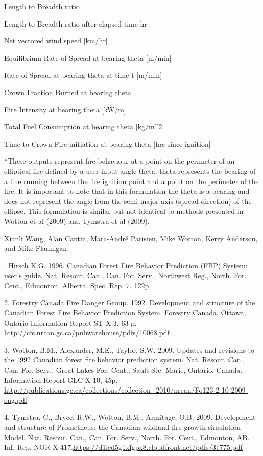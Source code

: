 \documentclass[a4paper]{book}
\begin{document}
\begin{Value}
\begin{ldescription}
\item[\code{LB}] Length to Breadth ratio
\item[\code{LBt}] Length to Breadth ratio after elapsed time hr 
\item[\code{WSV}] Net vectored wind speed [km/hr]
\item[\code{TROS*}] Equilibrium Rate of Spread at bearing theta [m/min] 
\item[\code{TROSt*}] Rate of Spread at bearing theta at time t [m/min] 
\item[\code{TCFB*}] Crown Fraction Burned at bearing theta 
\item[\code{TFI*}] Fire Intensity at bearing theta [kW/m] 
\item[\code{TTFC*}] Total Fuel Consumption at bearing theta [kg/m\textasciicircum{}2] 
\item[\code{TTI*}] Time to Crown Fire initiation at bearing theta [hrs since ignition] 

\end{ldescription}
*These outputs represent fire behaviour at a point on the perimeter of an
elliptical fire defined by a user input angle theta. theta represents the
bearing of a line running between the fire ignition point and a point on the
perimeter of the fire. It is important to note that in this formulation the
theta is a bearing and does not represent the angle from the semi-major axis
(spread direction) of the ellipse. This formulation is similar but not
identical to methods presented in Wotton et al (2009) and Tymstra et al
(2009).
\end{Value}
%
\begin{Author}\relax
Xianli Wang, Alan Cantin, Marc-André Parisien, Mike Wotton, Kerry
Anderson, and Mike Flannigan
\end{Author}
%
\begin{References}.  Hirsch K.G. 1996. Canadian Forest Fire Behavior Prediction
(FBP) System: user's guide. Nat. Resour. Can., Can. For. Serv., Northwest
Reg., North. For. Cent., Edmonton, Alberta. Spec. Rep. 7. 122p.

2.  Forestry Canada Fire Danger Group. 1992. Development and structure of
the Canadian Forest Fire Behavior Prediction System. Forestry Canada,
Ottawa, Ontario Information Report ST-X-3. 63 p.
\url{http://cfs.nrcan.gc.ca/pubwarehouse/pdfs/10068.pdf}

3.  Wotton, B.M., Alexander, M.E., Taylor, S.W. 2009. Updates and revisions
to the 1992 Canadian forest fire behavior prediction system. Nat. Resour.
Can., Can. For. Serv., Great Lakes For. Cent., Sault Ste. Marie, Ontario,
Canada. Information Report GLC-X-10, 45p.
\url{http://publications.gc.ca/collections/collection_2010/nrcan/Fo123-2-10-2009-eng.pdf}

4.  Tymstra, C., Bryce, R.W., Wotton, B.M., Armitage, O.B. 2009. Development
and structure of Prometheus: the Canadian wildland fire growth simulation
Model. Nat. Resour. Can., Can. For. Serv., North. For. Cent., Edmonton, AB.
Inf. Rep. NOR-X-417.\url{https://d1ied5g1xfgpx8.cloudfront.net/pdfs/31775.pdf}
\end{References}
\end{document}

